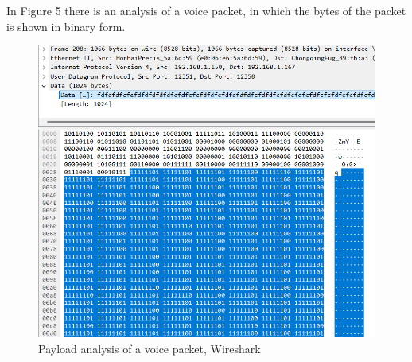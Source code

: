 \documentclass{article}
\begin{document}
\newpage
In Figure 5 there is an analysis of a voice packet, in which the bytes of the packet is shown in binary form.
\newline
\begin{figure}[h!]
    \centering
    \includegraphics[width=1\linewidth]{image5.png}
    \caption{Payload analysis of a voice packet, Wireshark}
    \label{fig:enter-label}
\end{figure}
\end{document}
